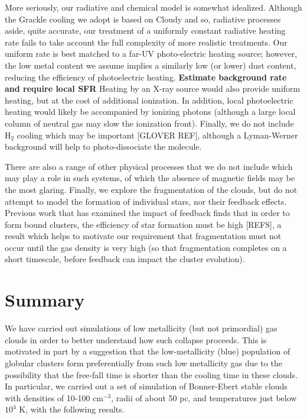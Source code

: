 \documentclass[useAMS,usenatbib]{mn2e}
\begin{document}
More seriously, our radiative and chemical model is somewhat idealized.  Although the {\sc Grackle} cooling we adopt is based on Cloudy and so, radiative processes aside, quite accurate, our treatment of a uniformly constant radiative heating rate fails to take account the full complexity of more realistic treatments.  Our uniform rate is best matched to a far-UV photo-electric heating source; however, the low metal content we assume implies a similarly low (or lower) dust content, reducing the efficiency of photoelectric heating. {\bf Estimate background rate and require local SFR}  Heating by an X-ray source would also provide uniform heating, but at the cost of additional ionization.  In addition, local photoelectric heating would likely be accompanied by ionizing photons (although a large local column of neutral gas may slow the ionization front).  Finally, we do not include H$_2$ cooling which may be important [GLOVER REF], although a Lyman-Werner background will help to photo-dissociate the molecule.

There are also a range of other physical processes that we do not include which may play a role in such systems, of which the absence of magnetic fields may be the most glaring.  Finally, we explore the fragmentation of the clouds, but do not attempt to model the formation of individual stars, nor their feedback effects.  Previous work that has examined the impact of feedback finds that in order to form bound clusters, the efficiency of star formation must be high [REFS], a result which helps to motivate our requirement that fragmentation must not occur until the gas density is very high (so that fragmentation completes on a short timescale, before feedback can impact the cluster evolution).

% 
\section{Summary}

We have carried out simulations of low metallicity (but not primordial) gas clouds in order to better understand  how such collapse proceeds.  This is motivated in part by a suggestion that the low-metallicity (blue) population of globular clusters form preferentially from such low metallicity gas due to the possibility that the free-fall time is shorter than the cooling time in these clouds.  In particular, we carried out a set of simulation of Bonner-Ebert stable clouds with densities of 10-100 cm$^{-3}$, radii of about 50 pc, and temperatures just below $10^4$ K, with the following results.
\end{document}

